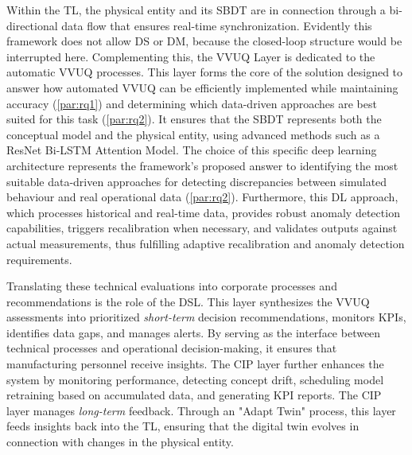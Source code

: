 Within the TL, the physical entity and its SBDT are in connection through a bi-directional data flow that ensures real-time synchronization. Evidently this framework does not allow DS or DM, because the closed-loop structure would be interrupted here. Complementing this, the VVUQ Layer is dedicated to the automatic VVUQ processes. This layer forms the core of the solution designed to answer how automated VVUQ can be efficiently implemented while maintaining accuracy (\autoref{par:rq1}) and determining which data-driven approaches are best suited for this task (\autoref{par:rq2}). It ensures that the SBDT represents both the conceptual model and the physical entity, using advanced methods such as a ResNet Bi-LSTM Attention Model. The choice of this specific deep learning architecture represents the framework's proposed answer to identifying the most suitable data-driven approaches for detecting discrepancies between simulated behaviour and real operational data (\autoref{par:rq2}). Furthermore, this DL approach, which processes historical and real-time data, provides robust anomaly detection capabilities, triggers recalibration when necessary, and validates outputs against actual measurements, thus fulfilling adaptive recalibration and anomaly detection requirements.

Translating these technical evaluations into corporate processes and recommendations is the role of the DSL. This layer synthesizes the VVUQ assessments into prioritized \textit{short-term} decision recommendations, monitors KPIs, identifies data gaps, and manages alerts. By serving as the interface between technical processes and operational decision-making, it ensures that manufacturing personnel receive insights. The CIP layer further enhances the system by monitoring performance, detecting concept drift, scheduling model retraining based on accumulated data, and generating KPI reports. The CIP layer manages \textit{long-term} feedback. Through an "Adapt Twin" process, this layer feeds insights back into the TL, ensuring that the digital twin evolves in connection with changes in the physical entity.

